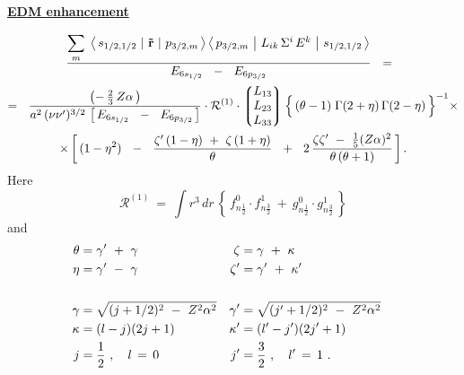 \documentclass[12pt]{revtex4}
\begin{document}
\begin{center}
\underline{\large
	\bf EDM enhancement
	}
\end{center}

\begin{multline}
\notag
	\frac{ 
%
%
	{\displaystyle \sum_m}\;
		\left< \,s_{1/2, 1/2}\, \left| ~\mathbf{\vec {r}}~ \right|
			\,p_{3/2, m}\, \right>
	\left< \,p_{3/2, m}\, \left| 
		~L_{ik}\, \Sigma^i \,E^k~
				\right|
			\,s_{1/2, 1/2}\,
	\right>
	}
%
	{ E_{6s_{1/2}} ~~-~~  E_{6p_{3/2}} }
	~~=~~ \\
%
\notag
	=~~
	\frac{ \left( -\, \frac{2}{3}\, Z \alpha \, \right) }
	{ 
		a^2\, (\nu\nu')^{3/2}\, 
		\left[ 
			\, E_{6s_{1/2}} ~~-~~  E_{6p_{3/2}} \,
		\right] 
	}
	\cdot
	\mathcal{R}^{(1)}
	\cdot
	\left\lgroup
		\begin{matrix}
			L_{13} \\
			L_{23} \\
			L_{33}
		\end{matrix}
	\right\rgroup
%
	\Bigl\{\,
		(\theta - 1 )\; \Gamma(2 + \eta)\, \Gamma(2 - \eta)
		\,
	\Bigr\}^{-1}
	\times
	\\
%
\notag
	\times
	\left[
		\,
		(1 - \eta^2) 
		~~-~~
		\frac{\zeta'\, ( 1 - \eta ) ~+~
			\zeta\, ( 1 + \eta )}
			{ \theta }
		~~+~~
		2\, 
		\frac{ \zeta\zeta' ~-~ \frac{1}{5} (Z\alpha)^2 }
			{ \theta\, ( \theta + 1 ) }
		\,
	\right]
	.
\end{multline}
	Here
\[
	\mathcal{R}^{(1)} ~=~
		\int r^3\,  dr\,
		\left\{
			\,
			f_{n\frac12}^0 \cdot f_{n\frac32}^1
			~+~
			g_{n\frac12}^0 \cdot g_{n\frac32}^1
			\,
		\right\}
\]
	and
\begin{align}
\notag  
	\theta & = \gamma' ~+~ \gamma &	 \zeta  & = \gamma ~+~ \kappa    \\
\notag  
	\eta   & = \gamma' ~-~ \gamma &	 \zeta' & = \gamma' ~+~ \kappa'  \\
\notag
	\\
\notag  
	\gamma & = \sqrt{ (j + 1/2)^2 ~-~ Z^2\alpha^2 } &
			\gamma' & = \sqrt{ (j' + 1/2)^2 ~-~ Z^2\alpha^2 } \\
\notag  
	\kappa & = (l - j)(2j + 1) &
			\kappa' & = (l' - j')(2j' + 1) & \\
\notag  
	j & = \frac12~,\quad l \,=\, 0 &
			j' & = \frac32~,\quad l' \,=\, 1 
	~.
\end{align}
\end{document}
